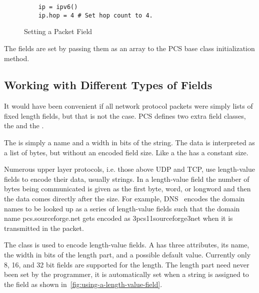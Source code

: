 \documentclass[11pt]{article}
\begin{document}
\begin{figure}
  \centering
\begin{verbatim}
    ip = ipv6()
    ip.hop = 4 # Set hop count to 4.
\end{verbatim}
  \caption{Setting a Packet Field}
  \label{fig:setting-a-packet-field}
\end{figure}

The fields are set by passing them as an array to the PCS base class
initialization method.

\subsection{Working with Different Types of Fields}

It would have been convenient if all network protocol packets were
simply lists of fixed length fields, but that is not the case.  PCS
defines two extra field classes, the  and the
.

The  is simply a name and a width in bits of the
string.  The data is interpreted as a list of bytes, but without an
encoded field size.  Like a  the  has
a constant size.

Numerous upper layer protocols, i.e. those above UDP and TCP, use
length-value fields to encode their data, usually strings.  In a
length-value field the number of bytes being communicated is given as
the first byte, word, or longword and then the data comes directly
after the size.  For example, DNS~\cite{rfc1035} encodes the domain
names to be looked up as a series of length-value fields such that the
domain name pcs.sourceforge.net gets encoded as 3pcs11sourceforge3net
when it is transmitted in the packet.

The  class is used to encode length-value
fields.  A  has three attributes, its name,
the width in bits of the length part, and a possible default value.
Currently only 8, 16, and 32 bit fields are supported for the length.
The length part need never been set by the programmer, it is
automatically set when a string is assigned to the field as shown
in~\ref{fig:using-a-length-value-field}.
\end{document}

